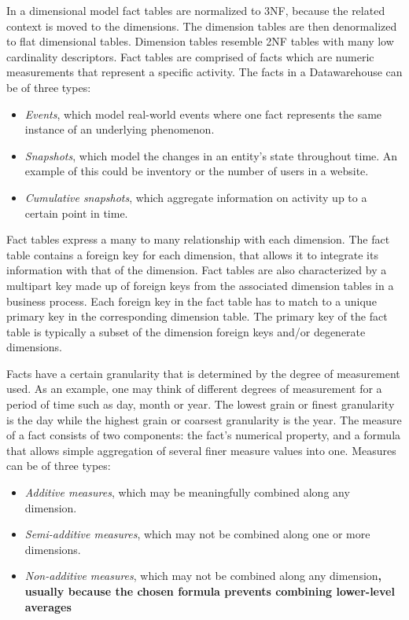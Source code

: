 \documentclass[]{article}
\begin{document}
In a dimensional model fact tables are normalized to 3NF, because the related context is moved to the dimensions. The dimension tables
are then denormalized to flat dimensional tables. Dimension tables resemble 2NF tables with many low cardinality descriptors. Fact
tables are comprised of facts which are numeric measurements that represent a specific activity. The facts in a Datawarehouse can be of
three types:
\begin{itemize}
	\item \emph{Events}, which model real-world events where one fact represents the same instance of an underlying phenomenon. 
	\item \emph{Snapshots}, which model the changes in an entity's state throughout time. An example of this could be inventory or the number of users in a website.
	\item \emph{Cumulative snapshots}, which aggregate information on activity up to a certain point in time.
\end{itemize}
Fact tables express a many to many relationship with each dimension. The fact table contains a foreign key for each dimension, that
allows it to integrate its information with that of the dimension. Fact tables are also characterized by a multipart key made up of
foreign keys from the associated dimension tables in a business process. Each foreign key in the fact table has to match to a unique
primary key in the corresponding dimension table. The primary key of the fact table is typically a subset of the dimension foreign keys
and/or degenerate dimensions.

Facts have a certain granularity that is determined by the degree of measurement used. As an example, one may think of different degrees
of measurement for a period of time such as day, month or year. The lowest grain or finest granularity is the day while the highest
grain or coarsest granularity is the year.
The measure of a fact consists of two components: the fact's numerical property, and a formula that allows simple aggregation of several
finer measure values into one. Measures can be of three types:
\begin{itemize}
\item \emph{Additive measures}, which may be meaningfully combined along any dimension.
\item \emph{Semi-additive measures}, which may not be combined along one or more dimensions.
\item \emph{Non-additive measures}, which may not be combined along any dimension\textbf{, usually because the chosen formula prevents combining lower-level averages}
\end{itemize}
\end{document}
